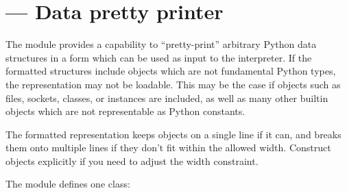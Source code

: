 \section{ ---
         Data pretty printer}



The  module provides a capability to ``pretty-print''
arbitrary Python data structures in a form which can be used as input
to the interpreter.  If the formatted structures include objects which
are not fundamental Python types, the representation may not be
loadable.  This may be the case if objects such as files, sockets,
classes, or instances are included, as well as many other builtin
objects which are not representable as Python constants.

The formatted representation keeps objects on a single line if it can,
and breaks them onto multiple lines if they don't fit within the
allowed width.  Construct  objects explicitly if
you need to adjust the width constraint.


The  module defines one class:



